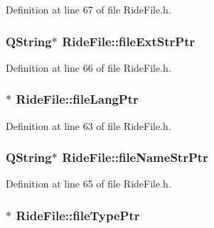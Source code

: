 Definition at line 67 of file Ride\-File.\-h.

\hypertarget{class_ride_file_a29d334700d1480159fc69b59f7dc02a8}{
\subsubsection[{file\-Ext\-Str\-Ptr}]{\setlength{\rightskip}{0pt plus 5cm}Q\-String$\ast$ Ride\-File\-::file\-Ext\-Str\-Ptr\hspace{0.3cm}{\ttfamily [private]}}}\label{class_ride_file_a29d334700d1480159fc69b59f7dc02a8}


Definition at line 66 of file Ride\-File.\-h.

\hypertarget{class_ride_file_acbfd3155fd50ad8fa0711ae3e452f372}{
\subsubsection[{file\-Lang\-Ptr}]{$\ast$ Ride\-File\-::file\-Lang\-Ptr\hspace{0.3cm}{\ttfamily [private]}}}\label{class_ride_file_acbfd3155fd50ad8fa0711ae3e452f372}


Definition at line 63 of file Ride\-File.\-h.

\hypertarget{class_ride_file_a6eeba18da5e7d5e7b3afde7c65bd1f7a}{
\subsubsection[{file\-Name\-Str\-Ptr}]{\setlength{\rightskip}{0pt plus 5cm}Q\-String$\ast$ Ride\-File\-::file\-Name\-Str\-Ptr\hspace{0.3cm}{\ttfamily [private]}}}\label{class_ride_file_a6eeba18da5e7d5e7b3afde7c65bd1f7a}


Definition at line 65 of file Ride\-File.\-h.

\hypertarget{class_ride_file_acdbc170d7f02d66dffb8b715609735c2}{
\subsubsection[{file\-Type\-Ptr}]{$\ast$ Ride\-File\-::file\-Type\-Ptr\hspace{0.3cm}{\ttfamily [private]}}}\label{class_ride_file_acdbc170d7f02d66dffb8b715609735c2}


